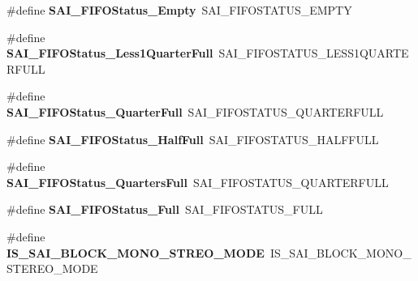 \begin{DoxyCompactItemize}
\item 
\hypertarget{group___h_a_l___s_a_i___aliased___macros_ga975ffaf2925f238e84e4ec58ff07507a}{\#define {\bfseries S\-A\-I\-\_\-\-F\-I\-F\-O\-Status\-\_\-\-Empty}~S\-A\-I\-\_\-\-F\-I\-F\-O\-S\-T\-A\-T\-U\-S\-\_\-\-E\-M\-P\-T\-Y}\label{group___h_a_l___s_a_i___aliased___macros_ga975ffaf2925f238e84e4ec58ff07507a}

\item 
\hypertarget{group___h_a_l___s_a_i___aliased___macros_ga8bf03716c694dc3221b640dc5de670b6}{\#define {\bfseries S\-A\-I\-\_\-\-F\-I\-F\-O\-Status\-\_\-\-Less1\-Quarter\-Full}~S\-A\-I\-\_\-\-F\-I\-F\-O\-S\-T\-A\-T\-U\-S\-\_\-\-L\-E\-S\-S1\-Q\-U\-A\-R\-T\-E\-R\-F\-U\-L\-L}\label{group___h_a_l___s_a_i___aliased___macros_ga8bf03716c694dc3221b640dc5de670b6}

\item 
\hypertarget{group___h_a_l___s_a_i___aliased___macros_ga521399b510e0f29fc41fb516a27fe517}{\#define {\bfseries S\-A\-I\-\_\-\-F\-I\-F\-O\-Status\-\_\-Quarter\-Full}~S\-A\-I\-\_\-\-F\-I\-F\-O\-S\-T\-A\-T\-U\-S\-\_\-Q\-U\-A\-R\-T\-E\-R\-F\-U\-L\-L}\label{group___h_a_l___s_a_i___aliased___macros_ga521399b510e0f29fc41fb516a27fe517}

\item 
\hypertarget{group___h_a_l___s_a_i___aliased___macros_gafe9200ac26339d1334ab978ae508f352}{\#define {\bfseries S\-A\-I\-\_\-\-F\-I\-F\-O\-Status\-\_\-\-Half\-Full}~S\-A\-I\-\_\-\-F\-I\-F\-O\-S\-T\-A\-T\-U\-S\-\_\-\-H\-A\-L\-F\-F\-U\-L\-L}\label{group___h_a_l___s_a_i___aliased___macros_gafe9200ac26339d1334ab978ae508f352}

\item 
\hypertarget{group___h_a_l___s_a_i___aliased___macros_ga50b6fc16c49a0d4eb2575567f5e9be98}{\#define {\bfseries S\-A\-I\-\_\-\-F\-I\-F\-O\-Status\-\_\-Quarters\-Full}~S\-A\-I\-\_\-\-F\-I\-F\-O\-S\-T\-A\-T\-U\-S\-\_\-Q\-U\-A\-R\-T\-E\-R\-F\-U\-L\-L}\label{group___h_a_l___s_a_i___aliased___macros_ga50b6fc16c49a0d4eb2575567f5e9be98}

\item 
\hypertarget{group___h_a_l___s_a_i___aliased___macros_ga5e2fd1ac3cea38c8c2fe15cf70efe61a}{\#define {\bfseries S\-A\-I\-\_\-\-F\-I\-F\-O\-Status\-\_\-\-Full}~S\-A\-I\-\_\-\-F\-I\-F\-O\-S\-T\-A\-T\-U\-S\-\_\-\-F\-U\-L\-L}\label{group___h_a_l___s_a_i___aliased___macros_ga5e2fd1ac3cea38c8c2fe15cf70efe61a}

\item 
\hypertarget{group___h_a_l___s_a_i___aliased___macros_gaa9eb7424d1a759fa3c84ee598b6d53a1}{\#define {\bfseries I\-S\-\_\-\-S\-A\-I\-\_\-\-B\-L\-O\-C\-K\-\_\-\-M\-O\-N\-O\-\_\-\-S\-T\-R\-E\-O\-\_\-\-M\-O\-D\-E}~I\-S\-\_\-\-S\-A\-I\-\_\-\-B\-L\-O\-C\-K\-\_\-\-M\-O\-N\-O\-\_\-\-S\-T\-E\-R\-E\-O\-\_\-\-M\-O\-D\-E}\label{group___h_a_l___s_a_i___aliased___macros_gaa9eb7424d1a759fa3c84ee598b6d53a1}


\end{DoxyCompactItemize}
